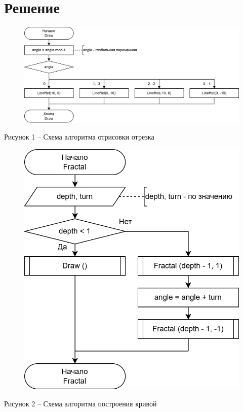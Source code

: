 \documentclass[a4paper,14pt]{extarticle}
\begin{document}
  \pagebreak
  \section*{Решение}

  \begin{figure}[h]
    \centering
    \includegraphics[width=1\linewidth]{images/s-1}
  \end{figure}
  \begin{center}
    Рисунок 1 – Схема алгоритма отрисовки отрезка
  \end{center}

  \begin{figure}[h]
    \centering
    \includegraphics[width=0.5\linewidth]{images/s-2}
  \end{figure}
  \begin{center}
    Рисунок 2 – Схема алгоритма построения кривой
  \end{center}

  \pagebreak
\end{document}
